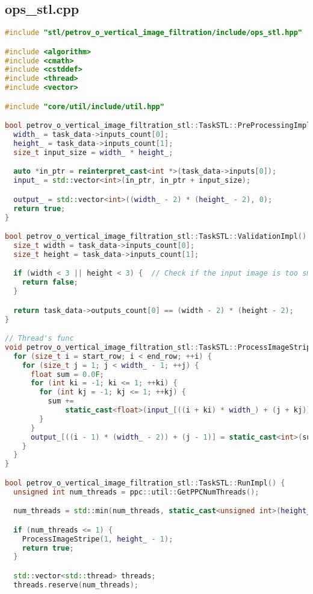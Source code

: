 \documentclass[12pt,a4paper]{extarticle}
\begin{document}
\subsection{ops\_stl.cpp}
\begin{lstlisting}[language=C++]
#include "stl/petrov_o_vertical_image_filtration/include/ops_stl.hpp"

#include <algorithm>
#include <cmath>
#include <cstddef>
#include <thread>
#include <vector>

#include "core/util/include/util.hpp"

bool petrov_o_vertical_image_filtration_stl::TaskSTL::PreProcessingImpl() {
  width_ = task_data->inputs_count[0];
  height_ = task_data->inputs_count[1];
  size_t input_size = width_ * height_;

  auto *in_ptr = reinterpret_cast<int *>(task_data->inputs[0]);
  input_ = std::vector<int>(in_ptr, in_ptr + input_size);

  output_ = std::vector<int>((width_ - 2) * (height_ - 2), 0);
  return true;
}

bool petrov_o_vertical_image_filtration_stl::TaskSTL::ValidationImpl() {
  size_t width = task_data->inputs_count[0];
  size_t height = task_data->inputs_count[1];

  if (width < 3 || height < 3) {  // Check if the input image is too small
    return false;
  }

  return task_data->outputs_count[0] == (width - 2) * (height - 2);
}

// Thread's func
void petrov_o_vertical_image_filtration_stl::TaskSTL::ProcessImageStripe(size_t start_row, size_t end_row) {
  for (size_t i = start_row; i < end_row; ++i) {
    for (size_t j = 1; j < width_ - 1; ++j) {
      float sum = 0.0F;
      for (int ki = -1; ki <= 1; ++ki) {
        for (int kj = -1; kj <= 1; ++kj) {
          sum +=
              static_cast<float>(input_[((i + ki) * width_) + (j + kj)]) * gaussian_kernel_[((ki + 1) * 3) + (kj + 1)];
        }
      }
      output_[((i - 1) * (width_ - 2)) + (j - 1)] = static_cast<int>(sum);
    }
  }
}

bool petrov_o_vertical_image_filtration_stl::TaskSTL::RunImpl() {
  unsigned int num_threads = ppc::util::GetPPCNumThreads();

  num_threads = std::min(num_threads, static_cast<unsigned int>(height_ - 2));

  if (num_threads <= 1) {
    ProcessImageStripe(1, height_ - 1);
    return true;
  }

  std::vector<std::thread> threads;
  threads.reserve(num_threads);


\end{lstlisting}
\end{document}
